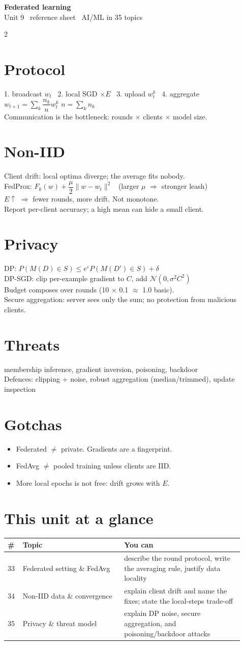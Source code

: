 \documentclass[11pt,a4paper]{article}
\newcommand{\sect}[1]{\section*{#1}}
\newcommand{\hd}[2]{\begin{center}{\large\bfseries #1}\\[-0.1em]{\small\color{gray}#2}\end{center}\vspace{-0.6em}}
\begin{document}
\hd{Federated learning}{Unit 9 \textperiodcentered\ reference sheet \textperiodcentered\ AI/ML in 35 topics}
\begin{multicols}{2}
\normalsize

\sect{Protocol}
1. broadcast $w_t$ \ 2. local SGD $\times E$ \ 3. upload $w_t^k$ \ 4. aggregate\\
$w_{t+1}=\sum_k\dfrac{n_k}{n}w_t^k$ \quad $n=\sum_k n_k$\\
Communication is the bottleneck: rounds $\times$ clients $\times$ model size.

\sect{Non-IID}
Client drift: local optima diverge; the average fits nobody.\\
FedProx: $F_k(w)+\dfrac{\mu}{2}\|w-w_t\|^2$ \ (larger $\mu$ $\Rightarrow$ stronger leash)\\
$E\uparrow$ $\Rightarrow$ fewer rounds, more drift. Not monotone.\\
Report per-client accuracy; a high mean can hide a small client.

\sect{Privacy}
DP: $P(M(D)\in S)\le e^\varepsilon P(M(D')\in S)+\delta$\\
DP-SGD: clip per-example gradient to $C$, add $\mathcal{N}(0,\sigma^2C^2)$\\
Budget composes over rounds (10 $\times$ 0.1 $\approx$ 1.0 basic).\\
Secure aggregation: server sees only the sum; no protection from malicious clients.

\sect{Threats}
membership inference, gradient inversion, poisoning, backdoor\\
Defences: clipping + noise, robust aggregation (median/trimmed), update inspection

\sect{Gotchas}
\begin{itemize}
\item Federated $\neq$ private. Gradients are a fingerprint.
\item FedAvg $\neq$ pooled training unless clients are IID.
\item More local epochs is not free: drift grows with $E$.
\end{itemize}

\sect{This unit at a glance}
\begin{tabular}{@{}p{0.05\linewidth}p{0.40\linewidth}p{0.47\linewidth}@{}}
\toprule
\# & Topic & You can\\
\midrule
33 & Federated setting \& FedAvg & describe the round protocol, write the averaging rule, justify data locality\\
34 & Non-IID data \& convergence & explain client drift and name the fixes; state the local-steps trade-off\\
35 & Privacy \& threat model & explain DP noise, secure aggregation, and poisoning/backdoor attacks\\
\bottomrule
\end{tabular}


\end{multicols}
\end{document}
